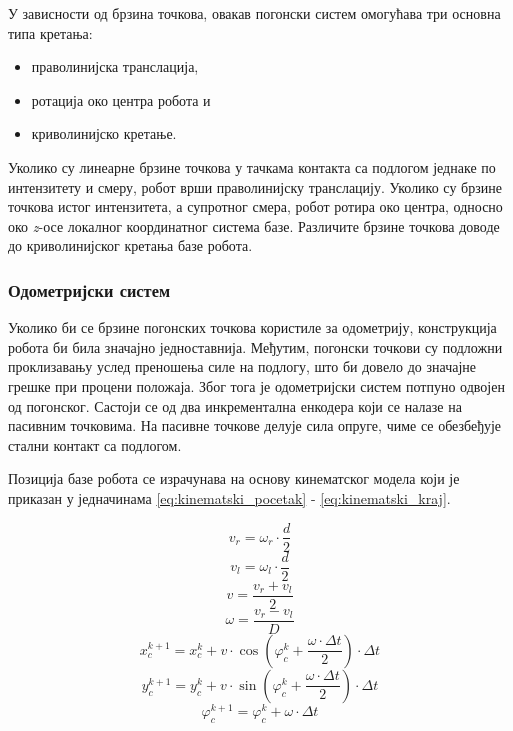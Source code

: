 \documentclass[12pt]{article}
\begin{document}
У зависности од брзина точкова, овакав погонски систем омогућава три основна
типа кретања:
\begin{itemize}
	\item праволинијска транслација,
	\item ротација око центра робота и
	\item криволинијско кретање.
\end{itemize}
Уколико су линеарне брзине точкова у тачкама контакта са подлогом једнаке по
интензитету и смеру, робот врши праволинијску транслацију. Уколико су брзине
точкова истог интензитета, а супротног смера, робот ротира око центра, односно
око \textit{z}-осе локалног координатног система базе. Различите брзине точкова
доводе до криволинијског кретања базе робота.

\subsubsection{Одометријски систем}
\label{sec:odom}
Уколико би се брзине погонских точкова користиле за одометрију, конструкција
робота би била значајно једноставнија. Међутим, погонски точкови су подложни
проклизавању услед преношења силе на подлогу, што би довело до значајне грешке
при процени положаја. Због тога је одометријски систем потпуно одвојен од
погонског. Састоји се од два инкрементална енкодера који се налазе на пасивним
точковима. На пасивне точкове делује сила опруге, чиме се обезбеђује стални
контакт са подлогом.

Позиција базе робота се израчунава на основу кинематског модела који је
приказан у једначинама \eqref{eq:kinematski_pocetak} -
\eqref{eq:kinematski_kraj}.

\begin{equation}
	v_r = \omega_r \cdot \dfrac{d}{2}
	\label{eq:kinematski_pocetak}
\end{equation}
\begin{equation}
	v_l = \omega_l \cdot \dfrac{d}{2}
\end{equation}
\begin{equation}
	v = \dfrac{v_r + v_l}{2}
\end{equation}
\begin{equation}
	\omega = \dfrac{v_r - v_l}{D}
\end{equation}
\begin{equation}
	x_c^{k+1} = x_c^k + v \cdot \cos(\varphi_c^k + \dfrac{\omega \cdot \Delta t}{2}) \cdot \Delta t
\end{equation}
\begin{equation}
	y_c^{k+1} = y_c^k + v \cdot \sin(\varphi_c^k + \dfrac{\omega \cdot \Delta t}{2}) \cdot \Delta t
\end{equation}
\begin{equation}
	\varphi_c^{k+1} = \varphi_c^k + \omega \cdot \Delta t
	\label{eq:kinematski_kraj}
\end{equation}
\end{document}
